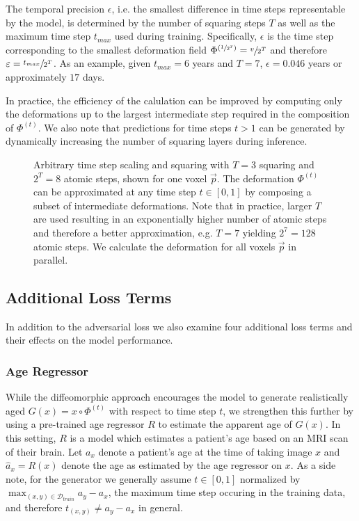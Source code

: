 The temporal precision $\epsilon$, i.e. the smallest difference in time steps representable by the model, is determined by the number of squaring steps $T$ as well as the maximum time step $t_{max}$ used during training. Specifically, $\epsilon$ is the time step corresponding to the smallest deformation field $\Phi^{(\sfrac{1}{2^T})} = \sfrac{v}{2^T}$ and therefore $\varepsilon = \sfrac{t_{max}}{2^T}$. As an example, given $t_{max} = 6$ years and $T = 7$, $\epsilon = 0.046$ years or approximately $17$ days.

In practice, the efficiency of the calulation can be improved by computing only the deformations up to the largest intermediate step required in the composition of $\Phi^{(t)}$. We also note that predictions for time steps $t > 1$ can be generated by dynamically increasing the number of squaring layers during inference.



\begin{figure}
	\centering
	
	\caption{Arbitrary time step scaling and squaring with $T = 3$ squaring and $ 2^{T} = 8 $ atomic steps, shown for one voxel $ \vec p $. The deformation $ \Phi^{(t)} $ can be approximated at any time step $ t \in [0, 1] $ by composing a subset of intermediate deformations. Note that in practice, larger $T$ are used resulting in an exponentially higher number of atomic steps and therefore a better approximation, e.g. $T = 7$ yielding $ 2^7 = 128 $ atomic steps. We calculate the deformation for all voxels $ \vec{p} $ in parallel.} \label{fig:arbtimestep}
\end{figure}

\subsection{Additional Loss Terms}
In addition to the adversarial loss we also examine four additional loss terms and their effects on the model performance.

\subsubsection*{Age Regressor}
\label{sec:adaagereg}
While the diffeomorphic approach encourages the model to generate realistically aged $G(x) = x \circ \Phi^{(t)}$ with respect to time step $t$, we strengthen this further by using a pre-trained age regressor $R$ to estimate the apparent age of $G(x)$. In this setting, $R$ is a model which estimates a patient's age based on an MRI scan of their brain.
Let $ a_x $ denote a patient's age at the time of taking image $x$ and $ \hat a_x = R(x)$ denote the age as estimated by the age regressor on $x$. As a side note, for the generator we generally assume $t \in [0, 1]$ normalized by $\max_{(x, y) \in \mathcal{D}_{train}} a_y - a_x $, the maximum time step occuring in the training data, and therefore $t_{(x, y)} \neq a_y - a_x$ in general.

